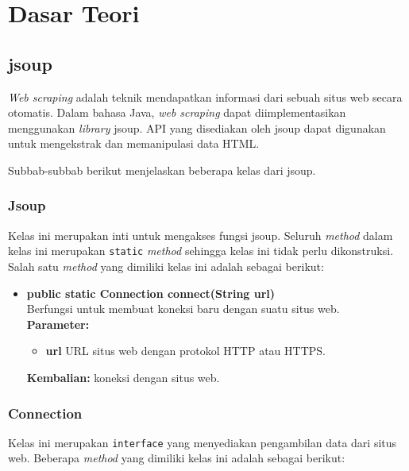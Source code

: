 \chapter{Dasar Teori}
\label{chap:Dasar Teori}

\section{jsoup}
\label{sec:jsoup}

\textit{Web scraping} adalah teknik mendapatkan informasi dari sebuah situs web secara otomatis\cite{Vargiu:2013}. Dalam bahasa Java, \textit{web scraping} dapat diimplementasikan menggunakan \textit{library} jsoup\cite{jsoup}. API yang disediakan oleh jsoup dapat digunakan untuk mengekstrak dan memanipulasi data HTML. 

Subbab-subbab berikut menjelaskan beberapa kelas dari jsoup.

\subsection{Jsoup}

Kelas ini merupakan inti untuk mengakses fungsi jsoup. Seluruh \textit{method} dalam kelas ini merupakan \texttt{static} \textit{method} sehingga kelas ini tidak perlu dikonstruksi. Salah satu \textit{method} yang dimiliki kelas ini adalah sebagai berikut:
\begin{itemize}
	\item \textbf{public static Connection connect(String url)} \\
		Berfungsi untuk membuat koneksi baru dengan suatu situs web. \\
		\textbf{Parameter:}
		\begin{itemize}
			\item \textbf{url} URL situs web dengan protokol HTTP atau HTTPS.
		\end{itemize}
		\textbf{Kembalian:} koneksi dengan situs web.
\end{itemize}

\subsection{Connection}

Kelas ini merupakan \texttt{interface} yang menyediakan pengambilan data dari situs web. Beberapa \textit{method} yang dimiliki kelas ini adalah sebagai berikut:

